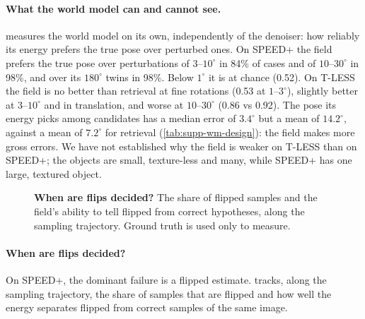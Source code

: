 \paragraph{What the world model can and cannot see.}
 measures the world model on its own, independently of the denoiser: how reliably its energy prefers the true pose
over perturbed ones. On SPEED+ the field prefers the true pose over perturbations of $3$--$10^\circ$ in 84\% of cases and of
$10$--$30^\circ$ in 98\%, and over its $180^\circ$ twins in 98\%. Below $1^\circ$ it is at chance (0.52).  On T-LESS the field is no better than retrieval at fine rotations (0.53 at $1$--$3^\circ$), slightly
better at $3$--$10^\circ$ and in translation, and worse at $10$--$30^\circ$ (0.86 vs 0.92). The pose its energy picks among candidates has a
median error of $3.4^\circ$ but a mean of $14.2^\circ$, against a mean of $7.2^\circ$ for retrieval (\cref{tab:supp-wm-design}): the field makes
more gross errors. We have not established why the field is weaker on T-LESS than on SPEED+; the objects are small, texture-less and
many, while SPEED+ has one large, textured object. 

\begin{figure}[t]
\centering
{}
\caption{\textbf{When are flips decided?} The share of flipped samples and the field's ability to tell flipped from correct
hypotheses, along the sampling trajectory. Ground truth is used only to measure. }
\label{fig:flip}
\end{figure}

\paragraph{When are flips decided?}
On SPEED+, the dominant failure is a flipped estimate.  tracks, along the sampling trajectory, the share of samples that
are flipped and how well the energy separates flipped from correct samples of the same image. 

